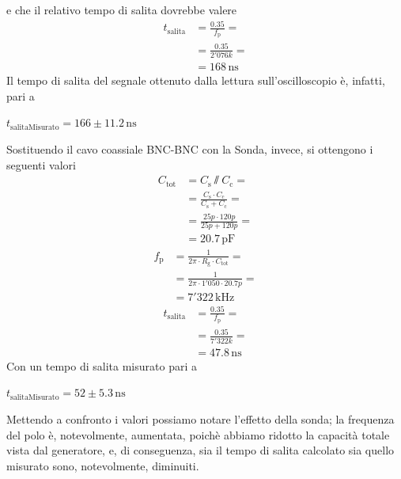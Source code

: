 \documentclass{article}
\begin{document}
				e che il relativo tempo di salita dovrebbe valere
				\begin{equation*}
					\begin{split}
						t_{\mathrm{salita}} &= \frac{0.35}{f_{\mathrm{p}}} = \\
											&= \frac{0.35}{2'076k} = \\
											&= 168 \, \mathrm{ns}
					\end{split}
				\end{equation*}
				Il tempo di salita del segnale ottenuto dalla lettura sull'oscilloscopio è, infatti, pari a
				\newline
				\begin{center}
					$ t_{\mathrm{salitaMisurato}} = 166 \pm 11.2 \, \mathrm{ns} $
				\end{center}
				\newline
				Sostituendo il cavo coassiale BNC-BNC con la Sonda, invece, si ottengono i seguenti valori
				\begin{equation*}
					\begin{split}
						C_{\mathrm{tot}} &= C_{\mathrm{s}} \sslash C_{\mathrm{c}} = \\
										 &= \frac{C_{\mathrm{s}} \cdot C_{\mathrm{c}}}{C_{\mathrm{s}} + C_{\mathrm{c}}} =\\
										 &= \frac{25p \cdot 120p}{25p + 120p} =\\
										 &= 20.7 \, \mathrm{pF}
					\end{split}
				\end{equation*}
				\begin{equation*}
					\begin{split}
						f_{\mathrm{p}} &= \frac{1}{2 \pi \cdot R_{\mathrm{g}} \cdot C_{\mathrm{tot}}} = \\
									   &= \frac{1}{2 \pi \cdot 1'050 \cdot 20.7p} = \\
									   &= 7'322 \, \mathrm{kHz}
					\end{split}
				\end{equation*}
				\begin{equation*}
					\begin{split}
						t_{\mathrm{salita}} &= \frac{0.35}{f_{\mathrm{p}}} = \\
											&= \frac{0.35}{7'322k} = \\
											&= 47.8 \, \mathrm{ns}
					\end{split}
				\end{equation*}
				Con un tempo di salita misurato pari a
				\newline
				\begin{center}
					$ t_{\mathrm{salitaMisurato}} = 52 \pm 5.3 \, \mathrm{ns} $
				\end{center}
				Mettendo a confronto i valori possiamo notare l'effetto della sonda; la frequenza del polo è, notevolmente, aumentata, poichè abbiamo ridotto la capacità totale vista dal generatore, e, di conseguenza, sia il tempo di salita calcolato sia quello misurato sono, notevolmente, diminuiti.
\end{document}
